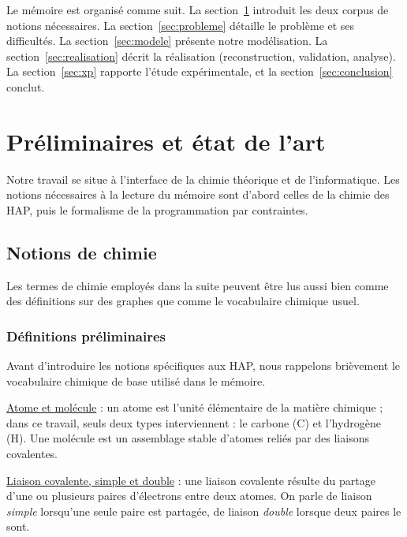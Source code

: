 \documentclass[11pt,a4paper]{article}
\begin{document}
Le mémoire est organisé comme suit. La section~\ref{sec:prelim} introduit les
deux corpus de notions nécessaires. La
section~\ref{sec:probleme} détaille le problème et ses difficultés. La
section~\ref{sec:modele} présente notre modélisation. La
section~\ref{sec:realisation} décrit la réalisation (reconstruction, validation,
analyse). La section~\ref{sec:xp} rapporte l'étude expérimentale, et la
section~\ref{sec:conclusion} conclut.

\section{Préliminaires et état de l'art}
\label{sec:prelim}

Notre travail se situe à l'interface de la chimie théorique et de
l'informatique. Les notions nécessaires à la lecture du mémoire sont
d'abord celles de la chimie des HAP, puis le formalisme de la
programmation par contraintes.

\subsection{Notions de chimie}

Les termes de chimie employés dans la suite peuvent être lus aussi bien
comme des définitions sur des graphes que comme le vocabulaire chimique
usuel.

\subsubsection{Définitions préliminaires}
\label{sec:chimie-prelim}

Avant d'introduire les notions spécifiques aux HAP, nous rappelons
brièvement le vocabulaire chimique de base utilisé dans le mémoire.

\underline{Atome et molécule} : un atome est l'unité élémentaire de la
matière chimique ; dans ce travail, seuls deux types interviennent : le
carbone (C) et l'hydrogène (H). Une molécule est un assemblage stable
d'atomes reliés par des liaisons covalentes.

\underline{Liaison covalente, simple et double} : une liaison covalente
résulte du partage d'une ou plusieurs paires d'électrons entre deux
atomes. On parle de liaison \emph{simple} lorsqu'une seule paire est
partagée, de liaison \emph{double} lorsque deux paires le sont.
\end{document}
